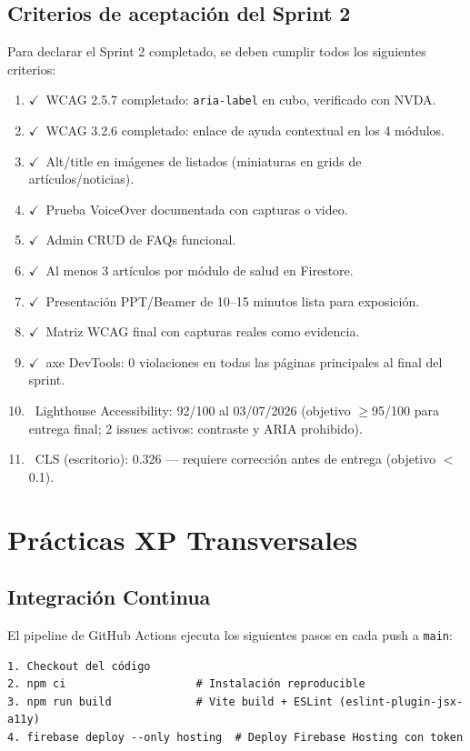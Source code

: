\documentclass[12pt, a4paper]{article}
\newcommand{\cmark}{\textcolor{successgreen}{$\checkmark$}}
\begin{document}
\subsection{Criterios de aceptación del Sprint 2}

Para declarar el Sprint 2 completado, se deben cumplir todos los siguientes criterios:

\begin{enumerate}
  \item \cmark~WCAG 2.5.7 completado: \texttt{aria-label} en cubo, verificado con NVDA.
  \item \cmark~WCAG 3.2.6 completado: enlace de ayuda contextual en los 4 módulos.
  \item \cmark~Alt/title en imágenes de listados (miniaturas en grids de artículos/noticias).
  \item \cmark~Prueba VoiceOver documentada con capturas o video.
  \item \cmark~Admin CRUD de FAQs funcional.
  \item \cmark~Al menos 3 artículos por módulo de salud en Firestore.
  \item \cmark~Presentación PPT/Beamer de 10--15 minutos lista para exposición.
  \item \cmark~Matriz WCAG final con capturas reales como evidencia.
  \item \cmark~axe DevTools: 0 violaciones en todas las páginas principales al final del sprint.
  \item \xmark~Lighthouse Accessibility: 92/100 al 03/07/2026 (objetivo $\geq$95/100 para entrega final; 2 issues activos: contraste y ARIA prohibido).
  \item \xmark~CLS (escritorio): 0.326 --- requiere corrección antes de entrega (objetivo $<$0.1).
\end{enumerate}

\section{Prácticas XP Transversales}

\subsection{Integración Continua}

El pipeline de GitHub Actions ejecuta los siguientes pasos en cada push a \texttt{main}:

\begin{lstlisting}[caption={Flujo de CI/CD --- .github/workflows/firebase-deploy.yml}]
1. Checkout del código
2. npm ci                    # Instalación reproducible
3. npm run build             # Vite build + ESLint (eslint-plugin-jsx-a11y)
4. firebase deploy --only hosting  # Deploy Firebase Hosting con token
\end{lstlisting}
\end{document}
